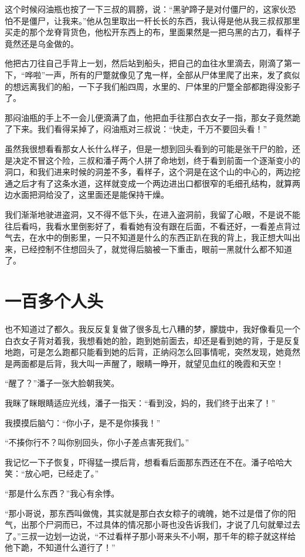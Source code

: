 这个时候闷油瓶也按了一下三叔的肩膀，说：“黑驴蹄子是对付僵尸的，这家伙恐怕不是僵尸，让我来。”他从包里取出一杆长长的东西，我认得是他从我三叔叔那里买走的那个龙脊背货色，他松开东西上的布，里面果然是一把乌黑的古刀，看样子竟然还是乌金做的。

他把古刀往自己手背上一划，然后站到船头，把自己的血往水里滴去，刚滴了第一下，“哗啦”一声，所有的尸蹩就像见了鬼一样，全部从尸体里爬了出来，发了疯似的想远离我们的船，一下子我们船四周，水里的、尸体里的尸蹩全部都跑得没影子了。

那闷油瓶的手上不一会儿便滴满了血，他把血手往那白衣女子一指，那女子竟然跪了下来。我们看得呆掉了，闷油瓶对三叔说：“快走，千万不要回头看！”

虽然我很想看看那女人长什么样子，但是一想到回头看到的可能是张干尸的脸，还是决定不冒这个险，三叔和潘子两个人拼了命地划，终于看到前面一个逐渐变小的洞口，和我们进来时候的洞差不多，看样子，这个洞是在这个山的中心的，两边挖通之后才有了这条水道，这样就变成一个两边进出口都很窄的毛细孔结构，就算两边水面把洞给没了，这里面还是能保持干燥。

我们渐渐地驶进盗洞，又不得不低下头，在进入盗洞前，我留了心眼，不是说不能往后看吗，我看水里倒影好了，看看她有没有跟在后面，不看还好，一看差点背过气去，在水中的倒影里，一只不知道是什么的东西正趴在我的背上，我正想大叫出来，已经控制不住想回头了，就觉得后脑被一下重击，眼前一黑就什么都不知道了。

\chapter{一百多个人头}

也不知道过了都久。我反反复复做了很多乱七八糟的梦，朦胧中，我好像看见一个白衣女子背对着我，我想看她的脸，跑到她前面去，却还是看到她的背，于是反复地跑，可是怎么跑都只能看到她的后背，正纳闷怎么回事情呢，突然发现，她竟然是两面都是后背，我大叫一声醒了，眼睛一睁开，就望见血红的晚霞和天空！

“醒了？”潘子一张大脸朝我笑。

我眯了眯眼睛适应光线，潘子一指天：“看到没，妈的，我们终于出来了！”

我摸摸后脑勺：“你小子，是不是你揍我！”

“不揍你行不？叫你别回头，你小子差点害死我们。”

我记忆一下子恢复，吓得猛一摸后背，想看看后面那东西还在不在。潘子哈哈大笑：“放心吧，已经走了。”

“那是什么东西？”我心有余悸。

“那小哥说，那东西叫做傀，其实就是那白衣女粽子的魂魄，她不过是借了你的阳气，出那个尸洞而已，不过具体的情况那小哥也没告诉我们，才说了几句就晕过去了。”三叔一边划一边说，“不过看样子那小哥来头不小啊，那千年的粽子就这样给他下跪，不知道什么道行了！”

